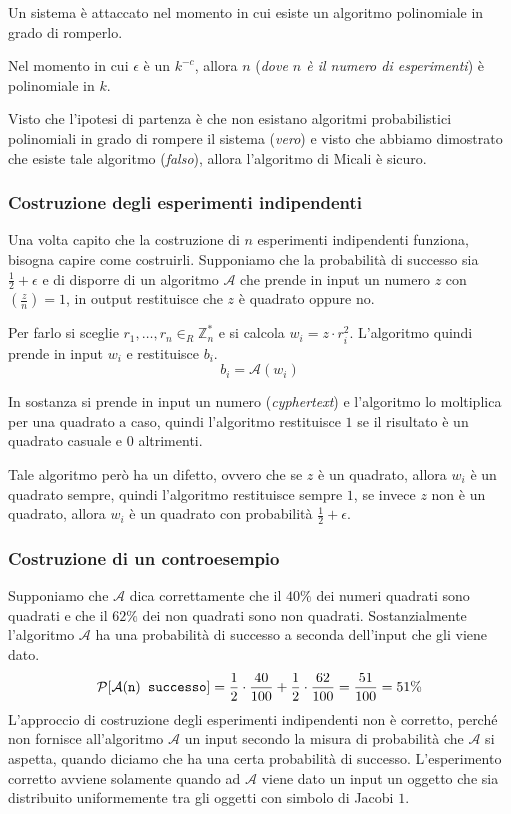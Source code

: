 Un sistema è attaccato nel momento in cui esiste un algoritmo polinomiale in 
grado di romperlo.

Nel momento in cui $\epsilon$ è un $k^{-c}$, allora $n$ (\textit{dove $n$ è il numero di
esperimenti}) è polinomiale in $k$.

Visto che l'ipotesi di partenza è che non esistano algoritmi probabilistici polinomiali in grado
di rompere il sistema (\textit{vero}) e visto che abbiamo dimostrato che esiste tale algoritmo (\textit{falso}), allora
l'algoritmo di Micali è sicuro.
\subsubsection{Costruzione degli esperimenti indipendenti}

Una volta capito che la costruzione di $n$ esperimenti indipendenti funziona, bisogna 
capire come costruirli. Supponiamo che la probabilità di successo sia $\frac{1}{2} + \epsilon$ e
di disporre di un algoritmo $\mathcal{A}$ che prende in input un numero $z$ 
con $\left(\frac{z}{n}\right) = 1$, in output restituisce che $z$ è quadrato oppure no.

Per farlo si sceglie $r_1, \dots, r_n \in_R \mathbb{Z}_n^*$ e
si calcola $w_i = z \cdot r_i^2$. L'algoritmo quindi prende in input $w_i$ e restituisce
$b_i$.
\[
  b_i = \mathcal{A}(w_i)
\]

In sostanza si prende in input un numero (\textit{cyphertext}) e l'algoritmo lo moltiplica per una 
quadrato a caso, quindi l'algoritmo restituisce $1$ se il risultato è un quadrato casuale e $0$
altrimenti.

Tale algoritmo però ha un difetto, ovvero che se $z$ è un quadrato, allora $w_i$ è un quadrato
sempre, quindi l'algoritmo restituisce sempre $1$, se invece $z$ non è un quadrato, allora
$w_i$ è un quadrato con probabilità $\frac{1}{2} + \epsilon$.
\subsubsection{Costruzione di un controesempio}
Supponiamo che $\mathcal{A}$ dica correttamente che il $40\%$ dei numeri quadrati sono quadrati e 
che il $62\%$ dei non quadrati sono non quadrati. Sostanzialmente l'algoritmo $\mathcal{A}$
ha una probabilità di successo a seconda dell'input che gli viene dato. 
\[
  \text{$\mathcal{P}$}[\mathcal{A}(\texttt{n})\texttt{ successo}] = \frac{1}{2} \cdot \frac{40}{100} + 
  \frac{1}{2} \cdot \frac{62}{100} = \frac{51}{100} = 51\%
\]
L'approccio di costruzione degli esperimenti indipendenti non è corretto, perché 
non fornisce all'algoritmo $\mathcal{A}$ un input secondo la misura di probabilità
che $\mathcal{A}$ si aspetta, quando diciamo che ha una certa probabilità di successo.
L'esperimento corretto avviene solamente quando ad $\mathcal{A}$ viene dato un input
un oggetto che sia distribuito uniformemente tra gli oggetti con simbolo di Jacobi $1$.
